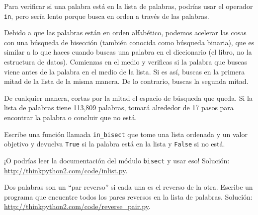 \documentclass[10pt]{book}
\begin{document}
\begin{exercise}
\label{wordlist1}
\label{bisection}

Para verificar si una palabra está en la lista de palabras, podrías usar
el operador {\tt in}, pero sería lento porque busca
en orden a través de las palabras.

Debido a que las palabras están en orden alfabético, podemos acelerar las cosas
con una búsqueda de bisección (también conocida como búsqueda binaria), que es
similar a lo que haces cuando buscas una palabra en el diccionario (el libro, no la estructura de datos).
Comienzas en el medio y verificas si la palabra que buscas
viene antes de la palabra en el medio de la lista.  Si es así,
buscas en la primera mitad de la lista de la misma manera.  De lo contrario, buscas
la segunda mitad.

De cualquier manera, cortas por la mitad el espacio de búsqueda que queda.  Si la
lista de palabras tiene 113,809 palabras, tomará alrededor de 17 pasos
para encontrar la palabra o concluir que no está.

Escribe una función llamada \verb"in_bisect" que tome una lista ordenada
y un valor objetivo y devuelva {\tt True} si la palabra está
en la lista y {\tt False} si no está.

¡O podrías leer la documentación del módulo {\tt bisect}
y usar eso!  Solución: \url{http://thinkpython2.com/code/inlist.py}.

\end{exercise}

\begin{exercise}

Dos palabras son un ``par reverso'' si cada una es el reverso de la
otra.  Escribe un programa que encuentre todos los pares reversos en la
lista de palabras.  Solución: \url{http://thinkpython2.com/code/reverse_pair.py}.

\end{exercise}
\end{document}

